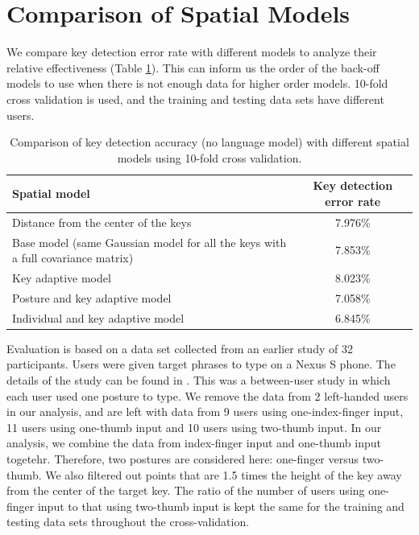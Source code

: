 \documentclass{sigchi}
\newcommand\tabhead[1]{\small\textbf{#1}}
\begin{document}
\section{Comparison of Spatial Models}
We compare key detection error rate with different models to analyze their
relative effectiveness (Table \ref{tab:comparison}). This can inform us the order of the
back-off models to use when there is not enough data for higher order models.
10-fold cross validation is used, and the training and testing data sets have
different users.

\begin{table} [tb]
  \centering
  \begin{tabular}{|l|c|}
    \hline
    \tabhead{Spatial model} &
    \multicolumn{1}{|p{0.2\columnwidth}|}{\centering\tabhead{Key detection
    error rate}} \\
    \hline
    Distance from the center of the keys & 7.976\% \\
    \hline
    \multicolumn{1}{|p{0.7\columnwidth}|}{Base model (same Gaussian model for
    all the keys with a full covariance matrix)} & 7.853\% \\
    \hline
    Key adaptive model  & 8.023\% \\
    \hline
    Posture and key adaptive model & 7.058\% \\
    \hline
    Individual and key adaptive model  & 6.845\% \\
    \hline
  \end{tabular}
  \caption{Comparison of key detection accuracy (no language model) with
  different spatial models using 10-fold cross validation.}
  \label{tab:comparison}
\end{table}

Evaluation is based on a data set collected from an earlier study of 32
participants. Users were given target phrases to type on a Nexus S phone. The
details of the study can be found in \cite{Azenkot:2012}. This was a between-user
study in which each user used one posture to type.
We remove the data from 2 left-handed users in our analysis, and are left with
data from 9 users using one-index-finger input, 11 users using one-thumb input and
10 users using two-thumb input.  In our analysis, we combine the data from index-finger input
and one-thumb input togetehr. Therefore, two postures are considered here: one-finger versus two-thumb. We also filtered out points that are 1.5 times
the height of the key away from the center of the target key. The ratio
of the number of users using one-finger input to that using two-thumb input is kept the same
for the training and testing data sets throughout the cross-validation.
\end{document}
